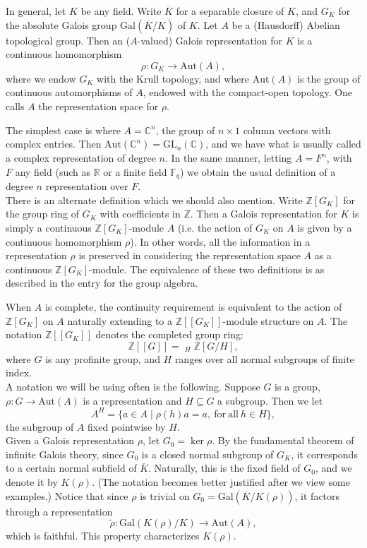 \documentclass[12pt]{article}
\newcommand{\Aut}{\mathrm{Aut}}
\newcommand{\bbC}{\mathbb{C}}
\newcommand{\bbF}{\mathbb{F}}
\newcommand{\bbR}{\mathbb{R}}
\newcommand{\bbZ}{\mathbb{Z}}
\newcommand{\cn}{\colon}
\newcommand{\Gal}{\mathrm{Gal}}
\newcommand{\GL}{\mathrm{GL}}
\newcommand{\ov}[1]{\overline{#1}}
\newcommand{\wt}[1]{\widetilde{#1}}
\newcommand{\liminv}{\mathop{\lim_{\longleftarrow}}}
\begin{document}
In general, let $K$ be any field.  Write $\ov{K}$ for a separable closure of $K$, and $G_K$ for the absolute Galois group $\Gal(\ov{K}/K)$ of $K$.  Let $A$ be a (Hausdorff) Abelian topological group.  Then an ($A$-valued) Galois representation for $K$ is a continuous homomorphism
\[
\rho \cn G_K \to \Aut(A),
\]
where we endow $G_K$ with the Krull topology, and where $\Aut(A)$ is the group of continuous automorphisms of $A$, endowed with the compact-open topology.  One calls $A$ the representation space for $\rho$.

The simplest case is where $A = \bbC^n$, the group of $n \times 1$ column vectors with complex entries.  Then $\Aut(\bbC^n) = \GL_n(\bbC)$, and we have what is usually called a complex representation of degree $n$.  In the same manner, letting $A = F^n$, with $F$ any field (such as $\bbR$ or a finite field $\bbF_q$) we obtain the usual definition of a degree $n$ representation over $F$.\\

There is an alternate definition which we should also mention.  Write $\bbZ[G_K]$ for the group ring of $G_K$ with coefficients in $\bbZ$.  Then a Galois representation for $K$ is simply a continuous $\bbZ[G_K]$-module $A$ (i.e. the action of $G_K$ on $A$ is given by a continuous homomorphism $\rho$).  In other words, all the information in a representation $\rho$ is preserved in considering the representation space $A$ as a continuous $\bbZ[G_K]$-module.  The equivalence of these two definitions is as described in the entry for the group algebra.

When $A$ is complete, the continuity requirement is equivalent to the action of $\bbZ[G_K]$ on $A$ naturally extending to a $\bbZ[\![G_K]\!]$-module structure on $A$.  The notation $\bbZ[\![G_K]\!]$ denotes the completed group ring:
\[
\bbZ[\![G]\!] = \liminv_H \bbZ[G/H],
\]
where $G$ is any profinite group, and $H$ ranges over all normal subgroups of finite index.\\

A notation we will be using often is the following.  Suppose $G$ is a group, $\rho \cn G \to \Aut(A)$ is a representation and $H \subseteq G$ a subgroup.  Then we let
\[
A^H = \{a \in A \mid \rho(h)a = a,\ \mathrm{for\ all\ }h \in H\},
\]
the subgroup of $A$ fixed pointwise by $H$.\\

Given a Galois representation $\rho$, let $G_0 = \ker \rho$.  By the fundamental theorem of infinite Galois theory, since $G_0$ is a closed normal subgroup of $G_K$, it corresponds to a certain normal subfield of $\ov{K}$.  Naturally, this is the fixed field of $G_0$, and we denote it by $K(\rho)$.  (The notation becomes better justified after we view some examples.)  Notice that since $\rho$ is trivial on $G_0 = \Gal(\ov{K}/K(\rho))$, it factors through a representation
\[
\wt{\rho} \cn \Gal(K(\rho)/K) \to \Aut(A),
\]
which is faithful.  This property characterizes $K(\rho)$.
\end{document}

